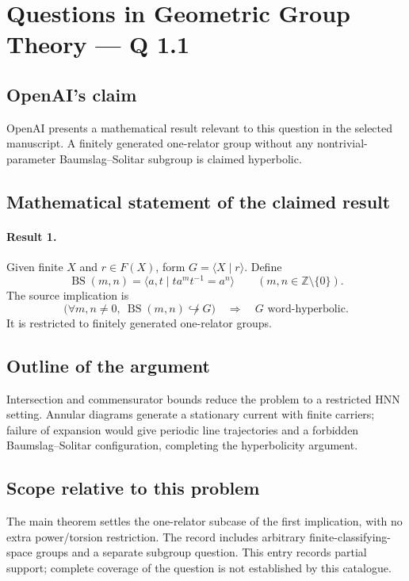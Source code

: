 \documentclass[11pt]{article}
\begin{document}
\section*{Questions in Geometric Group Theory — Q 1.1}

\subsection{OpenAI's claim}
OpenAI presents a mathematical result relevant to this question in the selected manuscript. A finitely generated one-relator group without any nontrivial-parameter Baumslag--Solitar subgroup is claimed hyperbolic.

\subsection{Mathematical statement of the claimed result}
\paragraph{Result 1.} Given finite \(X\) and \(r\in F(X)\), form \(G=\langle X\mid r\rangle\). Define
\[
 \operatorname{BS}(m,n)=\langle a,t\mid ta^mt^{-1}=a^n\rangle
 \qquad(m,n\in\mathbb Z\setminus\{0\}).
\]
The source implication is
\[
 \bigl(\forall m,n\ne0,\ \operatorname{BS}(m,n)\not\hookrightarrow G\bigr)
 \quad\Longrightarrow\quad G\text{ word-hyperbolic}.
\]
It is restricted to finitely generated one-relator groups.

\subsection{Outline of the argument}
Intersection and commensurator bounds reduce the problem to a restricted HNN setting. Annular diagrams generate a stationary current with finite carriers; failure of expansion would give periodic line trajectories and a forbidden Baumslag--Solitar configuration, completing the hyperbolicity argument.

\subsection{Scope relative to this problem}
The main theorem settles the one-relator subcase of the first implication, with no extra power/torsion restriction. The record includes arbitrary finite-classifying-space groups and a separate subgroup question. This entry records partial support; complete coverage of the question is not established by this catalogue.
\end{document}
